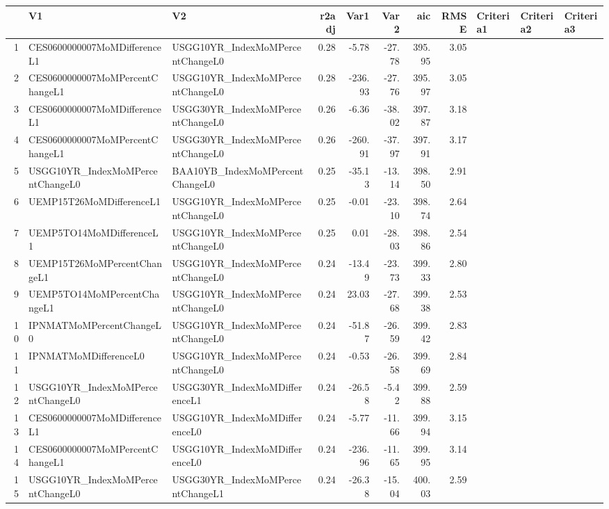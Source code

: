 \begin{longtable}{rllrrrrrlll}
  \hline
 & V1 & V2 & r2adj & Var1 & Var2 & aic & RMSE & Criteria1 & Criteria2 & Criteria3 \\ 
  \hline
1 & CES0600000007MoMDifferenceL1 & USGG10YR\_IndexMoMPercentChangeL0 & 0.28 & -5.78 & -27.78 & 395.95 & 3.05 &  &  &  \\ 
  2 & CES0600000007MoMPercentChangeL1 & USGG10YR\_IndexMoMPercentChangeL0 & 0.28 & -236.93 & -27.76 & 395.97 & 3.05 &  &  &  \\ 
  3 & CES0600000007MoMDifferenceL1 & USGG30YR\_IndexMoMPercentChangeL0 & 0.26 & -6.36 & -38.02 & 397.87 & 3.18 &  &  &  \\ 
  4 & CES0600000007MoMPercentChangeL1 & USGG30YR\_IndexMoMPercentChangeL0 & 0.26 & -260.91 & -37.97 & 397.91 & 3.17 &  &  &  \\ 
  5 & USGG10YR\_IndexMoMPercentChangeL0 & BAA10YB\_IndexMoMPercentChangeL0 & 0.25 & -35.13 & -13.14 & 398.50 & 2.91 &  &  &  \\ 
  6 & UEMP15T26MoMDifferenceL1 & USGG10YR\_IndexMoMPercentChangeL0 & 0.25 & -0.01 & -23.10 & 398.74 & 2.64 &  &  &  \\ 
  7 & UEMP5TO14MoMDifferenceL1 & USGG10YR\_IndexMoMPercentChangeL0 & 0.25 & 0.01 & -28.03 & 398.86 & 2.54 &  &  &  \\ 
  8 & UEMP15T26MoMPercentChangeL1 & USGG10YR\_IndexMoMPercentChangeL0 & 0.24 & -13.49 & -23.73 & 399.33 & 2.80 &  &  &  \\ 
  9 & UEMP5TO14MoMPercentChangeL1 & USGG10YR\_IndexMoMPercentChangeL0 & 0.24 & 23.03 & -27.68 & 399.38 & 2.53 &  &  &  \\ 
  10 & IPNMATMoMPercentChangeL0 & USGG10YR\_IndexMoMPercentChangeL0 & 0.24 & -51.87 & -26.59 & 399.42 & 2.83 &  &  &  \\ 
  11 & IPNMATMoMDifferenceL0 & USGG10YR\_IndexMoMPercentChangeL0 & 0.24 & -0.53 & -26.58 & 399.69 & 2.84 &  &  &  \\ 
  12 & USGG10YR\_IndexMoMPercentChangeL0 & USGG30YR\_IndexMoMDifferenceL1 & 0.24 & -26.58 & -5.42 & 399.88 & 2.59 &  &  &  \\ 
  13 & CES0600000007MoMDifferenceL1 & USGG10YR\_IndexMoMDifferenceL0 & 0.24 & -5.77 & -11.66 & 399.94 & 3.15 &  &  &  \\ 
  14 & CES0600000007MoMPercentChangeL1 & USGG10YR\_IndexMoMDifferenceL0 & 0.24 & -236.96 & -11.65 & 399.95 & 3.14 &  &  &  \\ 
  15 & USGG10YR\_IndexMoMPercentChangeL0 & USGG30YR\_IndexMoMPercentChangeL1 & 0.24 & -26.38 & -15.04 & 400.03 & 2.59 &  &  &  \\ 

\end{longtable}
